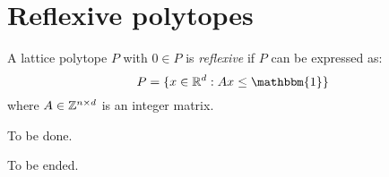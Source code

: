 

\bigskip 
\section{Reflexive polytopes}
\begin{definition}
  A lattice polytope $P$ with $0\in P$ is \emph{reflexive} if $P$ can be expressed as:
  \[
    P=\{x\in\RR^d:Ax\leq\mathbbm{1}\}
  \]
  where $A\in\mathbb{Z}^{n\times d}$ is an integer matrix.
\end{definition}

\begin{observation}
  To be done. %
\end{observation}

To be ended. %






